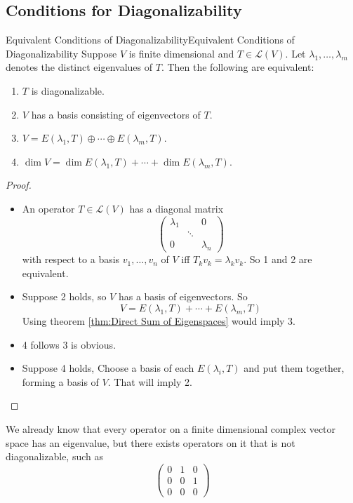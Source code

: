 \documentclass[../main.tex]{subfiles}
\begin{document}
\subsection{Conditions for Diagonalizability}
\begin{theorem}{Equivalent Conditions of Diagonalizability}{Equivalent Conditions of Diagonalizability}
Suppose $V$ is finite dimensional and $T\in \mathscr{L}(V)$. Let $\lambda_1, \ldots ,\lambda_m$ denotes the distinct eigenvalues of $T$. Then the following are equivalent:
\begin{enumerate}
	\item $T$ is diagonalizable.
	\item $V$ has a basis consisting of eigenvectors of $T$.
	\item $V = E(\lambda_1, T) \oplus \cdots \oplus E(\lambda_m,T)$.
	\item $\dim V= \dim E(\lambda_1, T) + \cdots +\dim E(\lambda_m,T)$.
\end{enumerate}
\end{theorem}
\begin{proof}
\begin{itemize}
\item An operator $T\in \mathscr{L}(V)$ has a diagonal matrix
	\begin{equation*}
	\begin{pmatrix}
		\lambda_1& &0\\
		&\ddots & \\
		0& &\lambda_n
	\end{pmatrix}
	\end{equation*}
with respect to a basis $v_1, \ldots ,v_n$ of $V$ iff $T_k v_k = \lambda_k v_k$. So 1 and 2 are equivalent.
\item Suppose 2 holds, so  $V$ has a basis of eigenvectors. So
	\begin{equation*}
	V = E(\lambda_1, T) +\cdots + E(\lambda_m,T)
	\end{equation*}
	Using theorem \ref{thm:Direct Sum of Eigenspaces} would imply 3.
\item 4 follows 3 is obvious.
\item Suppose 4 holds, Choose a basis of each $E(\lambda_i,T)$ and put them together, forming a basis of $V$. That will imply 2.
\end{itemize}
\end{proof}

\begin{remark}
We already know that every operator on a finite dimensional complex vector space has an eigenvalue, but there exists operators on it that is not diagonalizable, such as
\begin{equation*}
\begin{pmatrix}
	0&1&0\\0&0&1\\0&0&0
\end{pmatrix}
\end{equation*}
\end{remark}
\end{document}
